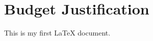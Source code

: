 \documentclass[12pt]{report}
\begin{document}
\section*{Budget Justification}
This is my first LaTeX document.

\end{document}
